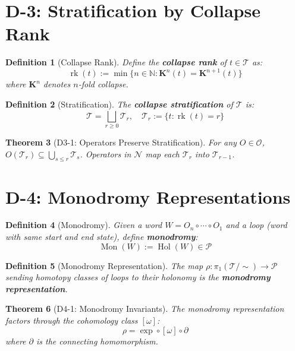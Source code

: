 \documentclass[12pt, oneside]{article}
\newtheorem{theorem}{Theorem}[section]
\newtheorem{definition}[theorem]{Definition}
\DeclareMathOperator{\Hol}{Hol}
\newcommand{\K}{\mathbf{K}}
\newcommand{\N}{\mathcal{N}}
\newcommand{\T}{\mathcal{T}}
\newcommand{\Opr}{\mathcal{O}}
\begin{document}
\section{D-3: Stratification by Collapse Rank}

\begin{definition}[Collapse Rank]
Define the \textbf{collapse rank} of $t \in \T$ as:
\begin{equation}
\operatorname{rk}(t) := \min\{ n \in \mathbb{N} : \K^n(t) = \K^{n+1}(t) \}
\end{equation}
where $\K^n$ denotes $n$-fold collapse.
\end{definition}

\begin{definition}[Stratification]
The \textbf{collapse stratification} of $\T$ is:
\begin{equation}
\T = \bigsqcup_{r \geq 0} \T_r,\quad \T_r := \{ t : \operatorname{rk}(t) = r \}
\end{equation}
\end{definition}

\begin{theorem}[D3-1: Operators Preserve Stratification]
For any $O \in \Opr$, $O(\T_r) \subseteq \bigcup_{s \leq r} \T_s$. Operators in $\N$ map each $\T_r$ into $\T_{r-1}$.
\end{theorem}

\section{D-4: Monodromy Representations}

\begin{definition}[Monodromy]
Given a word $W = O_n \circ \cdots \circ O_1$ and a loop (word with same start and end state), define \textbf{monodromy}:
\begin{equation}
\operatorname{Mon}(W) := \Hol(W) \in \mathcal{P}
\end{equation}
\end{definition}

\begin{definition}[Monodromy Representation]
The map $\rho: \pi_1(\T/\sim) \rightarrow \mathcal{P}$ sending homotopy classes of loops to their holonomy is the \textbf{monodromy representation}.
\end{definition}

\begin{theorem}[D4-1: Monodromy Invariants]
The monodromy representation factors through the cohomology class $[\omega]$:
\begin{equation}
\rho = \exp \circ [\omega] \circ \partial
\end{equation}
where $\partial$ is the connecting homomorphism.
\end{theorem}
\end{document}
